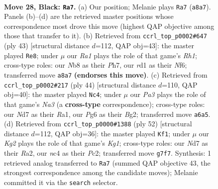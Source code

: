 \documentclass[11pt]{article}
\begin{document}
\clearpage

\begin{figure}[p]\centering
\begin{subfigure}{0.46\textwidth}\centering
\resizebox{\linewidth}{!}{%
\newchessgame
\chessboard[
  setfen={rnb5/1p1n2k1/p3ppp1/3r3p/1bN5/1P2P1PP/PBB1PK2/R2R4 b - - 2 28},
  showmover=false,
  pgfstyle=straightmove, color=movearrow, markmove={a8-a7}
]}
\caption{}
\end{subfigure}\hfill
\begin{subfigure}{0.46\textwidth}\centering
\resizebox{\linewidth}{!}{%
\newchessgame
\chessboard[
  setfen={3n3r/p1p1k1pp/1p2pn2/3r4/P1N5/2B3P1/1PP1R2P/4R1K1 b - - 0 22},
  showmover=false,
  pgfstyle=straightmove, color=movearrow, markmove={h8-e8}
]}
\caption{}
\end{subfigure}
\\[4pt]
\begin{subfigure}{0.46\textwidth}\centering
\resizebox{\linewidth}{!}{%
\newchessgame
\chessboard[
  setfen={r2r2k1/pp1b1pb1/2n1p1pp/3nP3/5P2/NPB2NP1/1P4BP/R2R2K1 w - - 1 23},
  showmover=false,
  pgfstyle=straightmove, color=movearrow, markmove={a3-c4}
]}
\caption{}
\end{subfigure}\hfill
\begin{subfigure}{0.46\textwidth}\centering
\resizebox{\linewidth}{!}{%
\newchessgame
\chessboard[
  setfen={2rr4/5pkp/4bnp1/1p2p3/4P3/1PN1R1PP/R1P2PB1/6K1 w - - 2 27},
  showmover=false,
  pgfstyle=straightmove, color=movearrow, markmove={g1-f1}
]}
\caption{}
\end{subfigure}
\caption{\textbf{Move 28, Black: \texttt{Ra7}.} (a) Our position; Melanie plays \texttt{Ra7} (\texttt{a8a7}). Panels (b)--(d) are the retrieved master positions whose correspondence most drove this move (highest QAP objective among those that transfer to it). (b) Retrieved from \texttt{ccrl\_top\_p0002\#647} (ply 43) [structural distance $d$=112, QAP obj=43]: the master played \texttt{Re8}; under $\mu$ our \emph{Ra1} plays the role of that game's \emph{Rh1}; cross-type roles: our \emph{N}b8 as their \emph{P}h7, our \emph{r}d1 as their \emph{N}f6; transferred move \texttt{a8a7} \textbf{(endorses this move)}. (c) Retrieved from \texttt{ccrl\_top\_p0002\#217} (ply 44) [structural distance $d$=110, QAP obj=40]: the master played \texttt{Nc4}; under $\mu$ our \emph{Pa3} plays the role of that game's \emph{Na3} (a \textbf{cross-type} correspondence); cross-type roles: our \emph{N}d7 as their \emph{R}a1, our \emph{P}g6 as their \emph{B}g2; transferred move \texttt{a6a5}. (d) Retrieved from \texttt{ccrl\_top\_p0000\#1388} (ply 52) [structural distance $d$=112, QAP obj=36]: the master played \texttt{Kf1}; under $\mu$ our \emph{Kg2} plays the role of that game's \emph{Kg1}; cross-type roles: our \emph{N}d7 as their \emph{R}a2, our \emph{n}c4 as their \emph{P}c2; transferred move \texttt{g7f7}. Synthesis: 1 retrieved analog transferred to \texttt{Ra7} (summed QAP objective 43, the strongest correspondence among the candidate moves); Melanie committed it via the \texttt{search} selector.}
\label{fig:thought-m55}
\end{figure}
\end{document}
